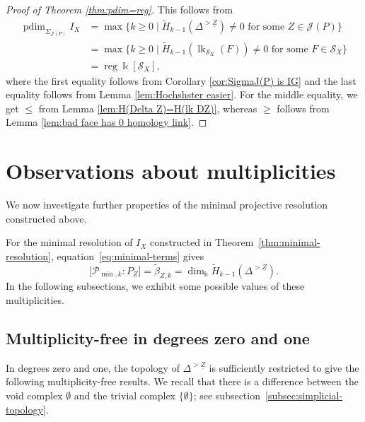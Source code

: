 \documentclass[a4paper,leqno]{amsart}
\begin{document}
\begin{proof}[Proof of Theorem \ref{thm:pdim=reg}]
This follows from
\begin{align*}
\operatorname{pdim}_{\Sigma_{\mathcal{J}(P)}} I_X
&=\max\{k\geq0\mid\widetilde H_{k-1}(\Delta^{>\underline{Z}})\neq0
             \text{ for some }Z\in\mathcal J(P)\}\\
&=\max\{k\geq0\mid\widetilde H_{k-1}(\operatorname{lk}_{\mathcal S_X}(F))\neq0
             \text{ for some }F\in\mathcal S_X\}\\
&=\operatorname{reg}\Bbbk[\mathcal S_X],
\end{align*}
where the first equality follows from Corollary \ref{cor:SigmaJ(P) is IG} and the last equality follows from Lemma \ref{lem:Hochshster easier}. For the middle equality, we get $\le$ from Lemma \ref{lem:H(Delta Z)=H(lk DZ)}, whereas $\ge$ follows from Lemma \ref{lem:bad face has 0 homology link}.
\end{proof}


\section{Observations about multiplicities}
\label{sec:low-degree-multiplicity}

We now investigate further properties of the minimal projective resolution constructed above.

For the minimal resolution of $I_X$ constructed in Theorem~\ref{thm:minimal-resolution}, equation~\eqref{eq:minimal-terms} gives
\begin{equation*}
 \bigl[\mathcal P_{\min,k}:P_Z\bigr]
 =\widetilde\beta_{Z,k}
 =\dim_{\Bbbk}\widetilde H_{k-1}(\Delta^{>\underline{Z}}).
\end{equation*}
In the following subsections, we exhibit some possible values of these multiplicities.

\subsection{Multiplicity-free in degrees zero and one}
\label{subsec:multi-free deg 0 1}
In degrees zero and one, the topology of $\Delta^{>\underline{Z}}$ is sufficiently restricted to give the following multiplicity-free results.  We recall that there is a difference between the void complex $\emptyset$ and the trivial complex $\{\emptyset\}$; see subsection~\ref{subsec:simplicial-topology}.
\end{document}
